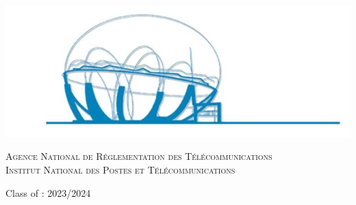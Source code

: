 \begin{center}
\begin{tabular}{p{1cm}lll}
\end{tabular}

\vspace{0.5cm}
\includegraphics[scale=0.55]{Logos/ZLAFA.png}


\textsc{Agence National de Réglementation des Télécommunications}\\
\textsc{Institut National des Postes et Télécommunications}

{\large Class of : 2023/2024}
   
\end{center}


